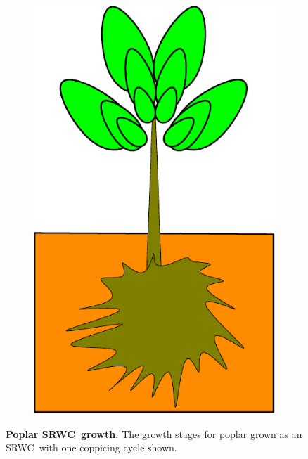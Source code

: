 \documentclass[10pt]{article}
\newcommand{\SRWC}{\textsc{SRWC}}
\begin{document}
\begin{figure}
\begin{subfigure}[b]{.1125\linewidth}
\includegraphics[width=1.0\linewidth]{img/tree_pics_4}
\caption{}  %
\label{fig:grow_8}
\end{subfigure}
\fi
\caption{ {\bf Poplar \SRWC~growth.} The growth stages for poplar
  grown as an \SRWC~with one coppicing cycle shown. }
\label{fig:grow}
\end{figure}
\end{document}
